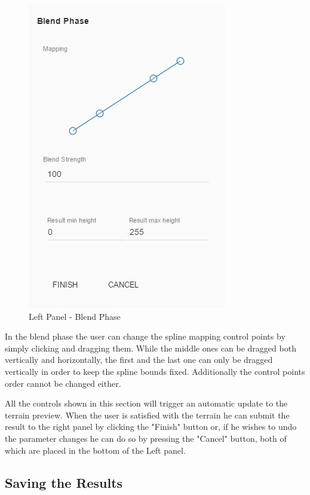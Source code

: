     \begin{figure}[H]
      \centering
      \includegraphics[width=\imagewidth]{images/screenshots/LeftBar-BlendPhase}
      \caption{Left Panel - Blend Phase}
      \label{fig:leftbar-blendphase}
    \end{figure}
   
    
    In the blend phase the user can change the spline mapping control points by simply clicking and dragging them. While the middle ones can be dragged both vertically and horizontally, the first and the last one can only be dragged vertically in order to keep the spline bounds fixed. Additionally the control points order cannot be changed either.
    
    All the controls shown in this section will trigger an automatic update to the terrain preview. When the user is satisfied with the terrain he can submit the result to the right panel by clicking the "Finish" button or, if he wishes to undo the parameter changes he can do so by pressing the "Cancel" button, both of which are placed in the bottom of the Left panel.
  
  \subsection {Saving the Results} \label{app:sec:saving}
  
